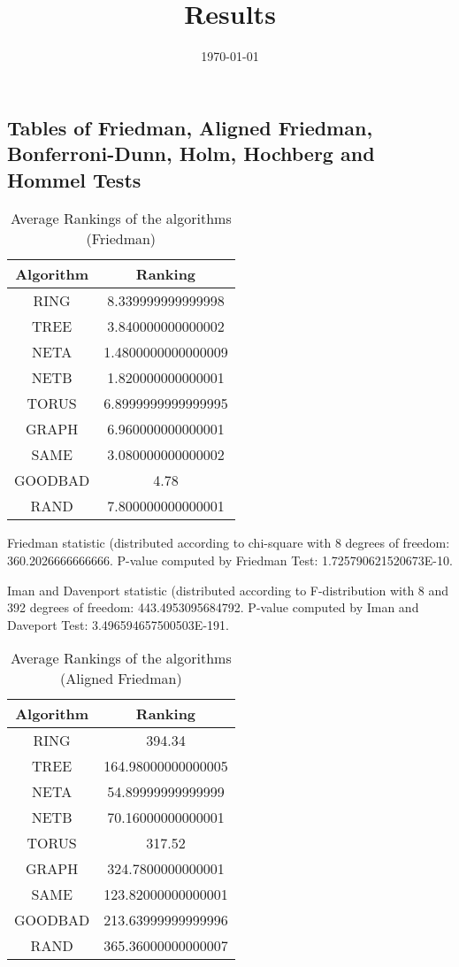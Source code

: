 \documentclass[a4paper,10pt]{article}
\title{Results}
\author{}
\date{\today}
\begin{document}
\begin{landscape}
\oddsidemargin 0in \topmargin 0in\maketitle
\section{Tables of Friedman, Aligned Friedman, Bonferroni-Dunn, Holm, Hochberg and Hommel Tests}
\begin{table}[!htp]
\centering
\caption{Average Rankings of the algorithms (Friedman)
}\begin{tabular}{c|c}
Algorithm&Ranking\\
\hline
 RING&8.339999999999998\\
 TREE&3.840000000000002\\
 NETA&1.4800000000000009\\
 NETB&1.820000000000001\\
 TORUS&6.8999999999999995\\
 GRAPH&6.960000000000001\\
 SAME&3.080000000000002\\
 GOODBAD&4.78\\
 RAND&7.800000000000001\\
\end{tabular}
\end{table}


Friedman statistic (distributed according to chi-square with 8 degrees of freedom: 360.2026666666666. 
P-value computed by Friedman Test: 1.725790621520673E-10.\newline

Iman and Davenport statistic (distributed according to F-distribution with 8 and 392 degrees of freedom: 443.4953095684792. 
P-value computed by Iman and Daveport Test: 3.496594657500503E-191.\newline


\newpage

\begin{table}[!htp]
\centering
\caption{Average Rankings of the algorithms (Aligned Friedman)
}\begin{tabular}{c|c}
Algorithm&Ranking\\
\hline
 RING&394.34\\
 TREE&164.98000000000005\\
 NETA&54.89999999999999\\
 NETB&70.16000000000001\\
 TORUS&317.52\\
 GRAPH&324.7800000000001\\
 SAME&123.82000000000001\\
 GOODBAD&213.63999999999996\\
 RAND&365.36000000000007\\
\end{tabular}
\end{table}



\end{landscape}
\end{document}
